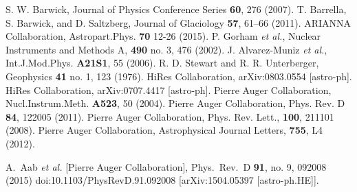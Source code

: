 \begin{thebibliography}{1}
 S. W. Barwick, Journal of Physics Conference Series \textbf{60}, 276 (2007).
  T. Barrella, S. Barwick, and D. Saltzberg, Journal of Glaciology \textbf{57}, 61–66 (2011).
 ARIANNA Collaboration, Astropart.Phys. \textbf{70} 12-26 (2015).
  P. Gorham {\it et al.}, Nuclear Instruments and Methods A, \textbf{490} no. 3,  476 (2002).
 J. Alvarez-Muniz {\it et al.}, Int.J.Mod.Phys. \textbf{A21S1}, 55 (2006).
 R. D. Stewart and R. R. Unterberger, Geophysics \textbf{41} no. 1, 123 (1976).
 HiRes Collaboration, arXiv:0803.0554 [astro-ph].
 HiRes Collaboration, arXiv:0707.4417 [astro-ph].
 Pierre Auger Collaboration, Nucl.Instrum.Meth. \textbf{A523},  50 (2004).
 Pierre Auger Collaboration, Phys. Rev. D \textbf{84}, 122005 (2011).
 Pierre Auger Collaboration, Phys. Rev. Lett., \textbf{100}, 211101 (2008).
 Pierre Auger Collaboration, Astrophysical Journal Letters, \textbf{755}, L4 (2012).

  A.~Aab {\it et al.} [Pierre Auger Collaboration],
  Phys.\ Rev.\ D {\bf 91}, no. 9, 092008 (2015)
  doi:10.1103/PhysRevD.91.092008
  [arXiv:1504.05397 [astro-ph.HE]].


\end{thebibliography}
